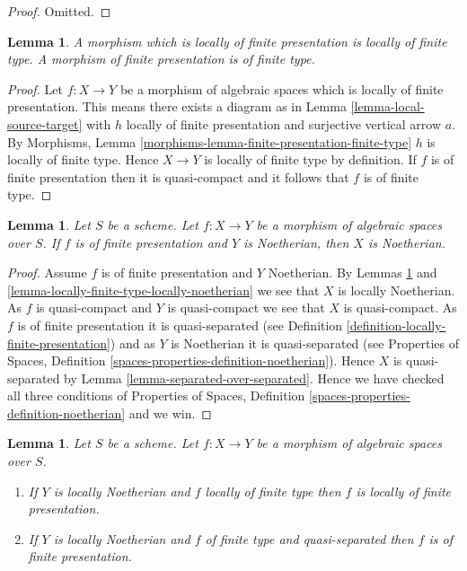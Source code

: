 \documentclass{stacks-project}
\theoremstyle{plain}
\newtheorem{lemma}[subsection]{Lemma}
\theoremstyle{definition}
\theoremstyle{remark}
\numberwithin{equation}{subsection}
\begin{document}
\begin{proof}
Omitted.
\end{proof}

\begin{lemma}
\label{lemma-finite-presentation-finite-type}
A morphism which is locally of finite presentation is locally of finite type.
A morphism of finite presentation is of finite type.
\end{lemma}

\begin{proof}
Let $f : X \to Y$ be a morphism of algebraic spaces which is locally of
finite presentation. This means there exists a diagram as in
Lemma \ref{lemma-local-source-target}
with $h$ locally of finite presentation and surjective vertical arrow $a$. By
Morphisms, Lemma \ref{morphisms-lemma-finite-presentation-finite-type}
$h$ is locally of finite type.
Hence $X \to Y$ is locally of finite type by definition.
If $f$ is of finite presentation then it is quasi-compact and
it follows that $f$ is of finite type.
\end{proof}

\begin{lemma}
\label{lemma-finite-presentation-noetherian}
Let $S$ be a scheme.
Let $f : X \to Y$ be a morphism of algebraic spaces over $S$.
If $f$ is of finite presentation and $Y$ is Noetherian,
then $X$ is Noetherian.
\end{lemma}

\begin{proof}
Assume $f$ is of finite presentation and $Y$ Noetherian. By
Lemmas \ref{lemma-finite-presentation-finite-type} and
\ref{lemma-locally-finite-type-locally-noetherian}
we see that $X$ is locally Noetherian. As $f$ is quasi-compact
and $Y$ is quasi-compact we see that $X$ is quasi-compact.
As $f$ is of finite presentation it is quasi-separated (see
Definition \ref{definition-locally-finite-presentation})
and as $Y$ is Noetherian it is quasi-separated (see
Properties of Spaces,
Definition \ref{spaces-properties-definition-noetherian}).
Hence $X$ is quasi-separated by
Lemma \ref{lemma-separated-over-separated}.
Hence we have checked all three conditions of
Properties of Spaces,
Definition \ref{spaces-properties-definition-noetherian}
and we win.
\end{proof}

\begin{lemma}
\label{lemma-noetherian-finite-type-finite-presentation}
Let $S$ be a scheme.
Let $f : X \to Y$ be a morphism of algebraic spaces over $S$.
\begin{enumerate}
\item If $Y$ is locally Noetherian and $f$ locally of finite type
then $f$ is locally of finite presentation.
\item If $Y$ is locally Noetherian and $f$ of finite type and quasi-separated
then $f$ is of finite presentation.
\end{enumerate}
\end{lemma}
\end{document}
